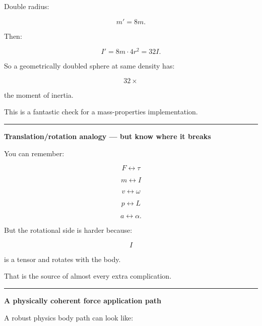 Double radius:

\[
m'=8m.
\]

Then:

\[
I'
=
8m\cdot4r^2
=
32I.
\]

So a geometrically doubled sphere at same density has:

\[
\boxed{
32\times
}
\]

the moment of inertia.

This is a fantastic check for a mass-properties implementation.

\begin{center}\rule{0.5\linewidth}{0.5pt}\end{center}

\textbf{Translation/rotation analogy --- but know where it breaks}

You can remember:

\[
F\leftrightarrow\tau
\]

\[
m\leftrightarrow I
\]

\[
v\leftrightarrow\omega
\]

\[
p\leftrightarrow L
\]

\[
a\leftrightarrow\alpha.
\]

But the rotational side is harder because:

\[
I
\]

is a tensor and rotates with the body.

That is the source of almost every extra complication.

\begin{center}\rule{0.5\linewidth}{0.5pt}\end{center}

\textbf{A physically coherent force application path}

A robust physics body path can look like:

